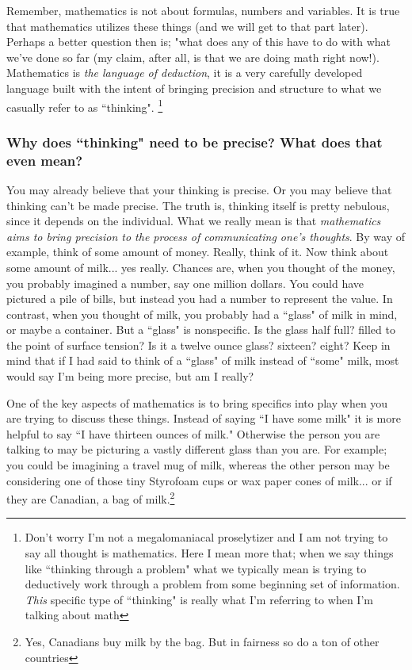 Remember, mathematics is not about formulas, numbers and variables. It is true that mathematics utilizes these things (and we will get to that part later). Perhaps a better question then is; "what does any of this have to do with what we've done so far (my claim, after all, is that we are doing math right now!). Mathematics is \textit{the language of deduction}, it is a very carefully developed language built with the intent of bringing precision and structure to what we casually refer to as ``thinking".%
\footnote{Don't worry I'm not a megalomaniacal proselytizer and I am not trying to say all thought is mathematics. Here I mean more that; when we say things like ``thinking through a problem" what we typically mean is trying to deductively work through a problem from some beginning set of information. \textit{This} specific type of ``thinking" is really what I'm referring to when I'm talking about math}

\subsubsection*{Why does ``thinking" need to be precise? What does that even mean?}
You may already believe that your thinking is precise. Or you may believe that thinking can't be made precise. The truth is, thinking itself is pretty nebulous, since it depends on the individual. What we really mean is that \textit{mathematics aims to bring precision to the process of communicating one's thoughts}. By way of example, think of some amount of money. Really, think of it. Now think about some amount of milk... yes really. Chances are, when you thought of the money, you probably imagined a number, say one million dollars. You could have pictured a pile of bills, but instead you had a number to represent the value. In contrast, when you thought of milk, you probably had a ``glass" of milk in mind, or maybe a container. But a ``glass" is nonspecific. Is the glass half full? filled to the point of surface tension? Is it a twelve ounce glass? sixteen? eight? Keep in mind that if I had said to think of a ``glass" of milk instead of ``some" milk, most would say I'm being more precise, but am I really?

One of the key aspects of mathematics is to bring specifics into play when you are trying to discuss these things. Instead of saying ``I have some milk" it is more helpful to say ``I have thirteen ounces of milk." Otherwise the person you are talking to may be picturing a vastly different glass than you are. For example; you could be imagining a travel mug of milk, whereas the other person may be considering one of those tiny Styrofoam cups or wax paper cones of milk... or if they are Canadian, a bag of milk.\footnote{Yes, Canadians buy milk by the bag. But in fairness so do a ton of other countries}

